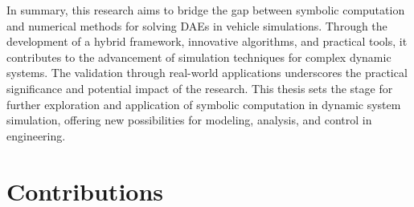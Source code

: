 In summary, this research aims to bridge the gap between symbolic computation and numerical methods for solving \acp{DAE} in vehicle simulations. Through the development of a hybrid framework, innovative algorithms, and practical tools, it contributes to the advancement of simulation techniques for complex dynamic systems. The validation through real-world applications underscores the practical significance and potential impact of the research. This thesis sets the stage for further exploration and application of symbolic computation in dynamic system simulation, offering new possibilities for modeling, analysis, and control in engineering.


\section{Contributions}

